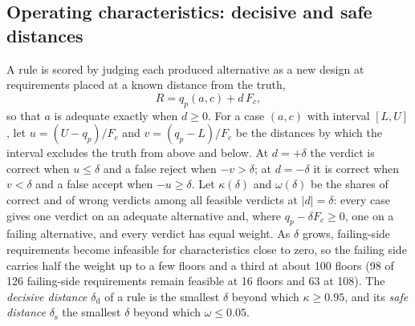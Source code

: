 \documentclass[pdflatex,sn-basic,lineno]{sn-jnl}
\begin{document}
\subsection{Operating characteristics: decisive and safe distances}\label{sec:distances}

A rule is scored by judging each produced alternative as a new design at requirements placed at a known distance from the truth,
\begin{equation}
R = q_p(a,c) + d\,F_c ,
\label{eq:requirement}
\end{equation}
so that $a$ is adequate exactly when $d\ge 0$. For a case $(a,c)$ with interval $[L,U]$, let $u=(U-q_p)/F_c$ and $v=(q_p-L)/F_c$ be the distances by which the interval excludes the truth from above and below. At $d=+\delta$ the verdict is correct when $u\le\delta$ and a false reject when $-v>\delta$; at $d=-\delta$ it is correct when $v<\delta$ and a false accept when $-u\ge\delta$. Let $\kappa(\delta)$ and $\omega(\delta)$ be the shares of correct and of wrong verdicts among all feasible verdicts at $|d|=\delta$: every case gives one verdict on an adequate alternative and, where $q_p-\delta F_c\ge0$, one on a failing alternative, and every verdict has equal weight. As $\delta$ grows, failing-side requirements become infeasible for characteristics close to zero, so the failing side carries half the weight up to a few floors and a third at about 100 floors (98 of 126 failing-side requirements remain feasible at 16 floors and 63 at 108). The \emph{decisive distance} $\delta_\mathrm{d}$ of a rule is the smallest $\delta$ beyond which $\kappa\ge 0.95$, and its \emph{safe distance} $\delta_\mathrm{s}$ the smallest $\delta$ beyond which $\omega\le 0.05$.
\end{document}

